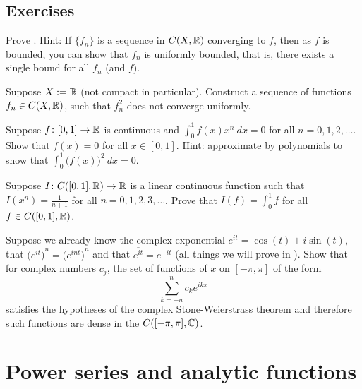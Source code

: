 \subsection{Exercises}

\begin{exercise}
Prove .
Hint: If $\{ f_n \}$ is a sequence in $C(X,{\mathbb{R}})$
converging to $f$, then as $f$ is bounded, you can show
that $f_n$ is uniformly bounded, that is, there exists a
single bound for all $f_n$ (and $f$).
\end{exercise}

\begin{exercise}
Suppose $X := {\mathbb{R}}$ (not compact in particular).
Construct a sequence of
functions $f_n \in C(X,{\mathbb{R}})$, such that $f_n^2$
does not converge uniformly.
\end{exercise}

\begin{exercise}
Suppose $f \colon [0,1] \to {\mathbb{R}}$ is continuous and
$\int_0^1 f(x) x^n ~dx = 0$ for all $n = 0,1,2,\ldots$.
Show that $f(x) = 0$ for all $x \in [0,1]$.
Hint: approximate by polynomials to show that $\int_0^1 {\bigl( f(x)
\bigr)}^2 ~ dx = 0$.
\end{exercise}

\begin{exercise}
Suppose $I \colon C([0,1],{\mathbb{R}}) \to {\mathbb{R}}$ is 
a linear continuous function such that
$I(x^n) = \frac{1}{n+1}$
for all $n=0,1,2,3,\ldots$.
Prove that $I(f) = \int_0^1 f$ for all $f \in C([0,1],{\mathbb{R}})$.
\end{exercise}

\begin{exercise}
Suppose we already know the complex exponential $e^{it} = \cos(t) + i \sin
(t)$, that
${\bigl(e^{it}\bigr)}^n = {\bigl(e^{int}\bigr)}^n$
and that
$\overline{e^{it}} = e^{-it}$ (all things
we will prove in ).
Show that for complex numbers $c_j$, the set of functions
of $x$ on $[-\pi,\pi]$
of the form
\begin{equation*}
\sum_{k=-n}^n c_k e^{ik x}
\end{equation*}
satisfies the hypotheses of the complex Stone-Weierstrass theorem
and therefore such functions are dense in the $C([-\pi,\pi],{\mathbb{C}})$.
\end{exercise}



\sectionnewpage
\section{Power series and analytic functions}
\label{sec:analfuncs}

